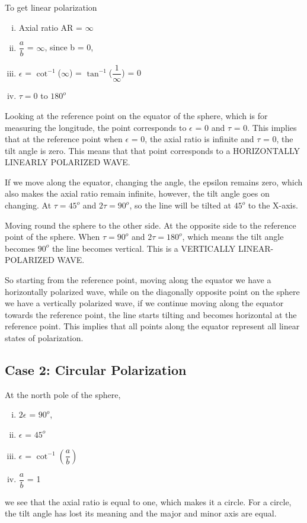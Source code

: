 To get linear polarization
\begin{enumerate}[(i)]
\item Axial ratio AR = $\infty$
\item $\dfrac{a}{b}$ = $\infty$, since b = 0,
\item $\epsilon$ = $\cot^{-1}$($\infty$) = $\tan^{-1}$($\dfrac{1}{\infty}$) = 0
\item $\tau = 0  $ to $  180^{o} $
\end{enumerate}
Looking at the reference point on the equator of the sphere, which is for measuring the longitude, the point corresponds to $\epsilon$ = 0 and $\tau$ = 0. This implies that at the reference point when $\epsilon$ = 0, the axial ratio is infinite and $\tau$ = 0, the tilt angle is zero. This means that that point corresponds to a HORIZONTALLY LINEARLY POLARIZED WAVE.

If we move along the equator, changing the angle, the epsilon remains zero, which also makes the axial ratio remain infinite, however, the tilt angle goes on changing. At $\tau = 45^{o}$ and $2\tau = 90^{o}$, so the line will be tilted at $45^{o}$ to the X-axis.

Moving round the sphere to the other side. At the opposite side to the reference point of the sphere. When $\tau = 90^{o}$ and $2\tau = 180^{o}$, which means the tilt angle becomes $90^{o}$ the line becomes vertical. This is a VERTICALLY LINEAR-POLARIZED WAVE. 

So starting from the reference point, moving along the equator we have a horizontally polarized wave, while on the diagonally opposite point on the sphere we have a vertically polarized wave, if we continue moving along the equator towards the reference point, the line starts tilting and becomes horizontal at the reference point. This implies that all points along the equator represent all linear states of polarization.


\subsection{Case 2: Circular Polarization}
At the north pole of the sphere,
\begin{enumerate}[(i)]
\item 	$2\epsilon$ = $90^{o}$, 
\item	$\epsilon$ = $45^{o}$
\item	$\epsilon$ = $\cot^{-1}(\dfrac{a}{b})$
\item	$\dfrac{a}{b}$ = 1
\end{enumerate}
we see that the axial ratio is equal to one, which makes it a circle. For a circle, the tilt angle has lost its meaning and the major and minor axis are equal.

